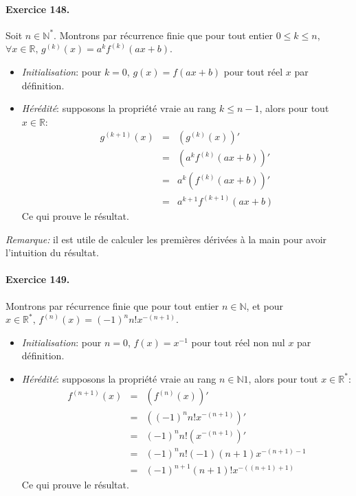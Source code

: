 \paragraph{Exercice 148.} Soit $n \in \mathbb{N}^*$. Montrons par récurrence finie que pour tout entier $0 \leq k \leq n$, $\forall x\in \mathbb{R}, \, g^{(k)}(x)=a^kf^{(k)}(ax+b)$.
\begin{itemize}
  \item \textit{Initialisation}: pour $k=0$, $g(x)=f(ax+b)$ pour tout réel $x$ par définition.
  \item \textit{Hérédité}: supposons la propriété vraie au rang $k \leq n-1$, alors pour tout $x \in \mathbb{R}$:
  \begin{eqnarray}
    g^{(k+1)}(x) &=& \left( g^{(k)}(x) \right)'  \nonumber \\
                &=& \left( a^kf^{(k)}(ax+b) \right)'  \nonumber \\
                &=& a^k \left( f^{(k)}(ax+b) \right)'  \nonumber \\
                &=& a^{k+1} f^{(k+1)}(ax+b)  \nonumber 
  \end{eqnarray}
  Ce qui prouve le résultat.
\end{itemize}

\textit{Remarque:} il est utile de calculer les premières dérivées à la main pour avoir l'intuition du résultat.

\paragraph{Exercice 149.} Montrons par récurrence finie que pour tout entier $n\in \mathbb{N}$, et pour $x\in \mathbb{R}^*, \, f^{(n)}(x)=(-1)^nn!x^{-(n+1)}$.
\begin{itemize}
  \item \textit{Initialisation}: pour $n=0$, $f(x)=x^{-1}$ pour tout réel non nul $x$ par définition.
  \item \textit{Hérédité}: supposons la propriété vraie au rang $n\in \mathbb{N}1$, alors pour tout $x \in \mathbb{R}^*$:
  \begin{eqnarray}
    f^{(n+1)}(x) &=& \left( f^{(n)}(x) \right)'  \nonumber \\
                &=& \left( (-1)^nn!x^{-(n+1)} \right)'  \nonumber \\
                &=& (-1)^nn! \left( x^{-(n+1)} \right)'  \nonumber \\
                &=& (-1)^nn!(-1)(n+1) x^{-(n+1)-1} \nonumber \\
                &=& (-1)^{n+1}(n+1)!x^{-((n+1)+1)} \nonumber 
  \end{eqnarray}
  Ce qui prouve le résultat.
\end{itemize}

